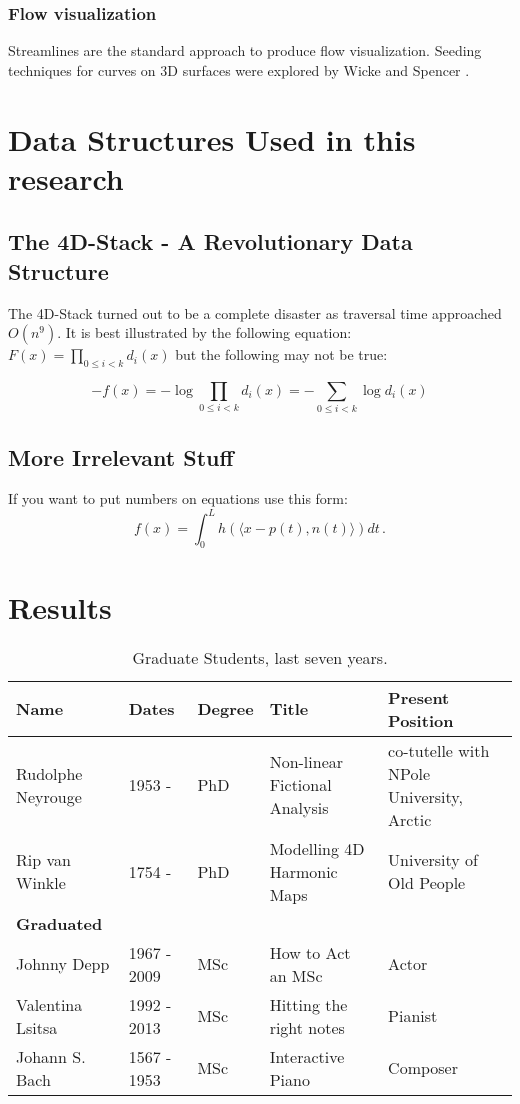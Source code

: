 \documentclass[11pt]{report}
\begin{document}
\subsection{Flow visualization}

Streamlines are the standard approach to produce flow visualization. 
Seeding techniques for curves on 3D surfaces were explored by Wicke \cite{Wicke2009} and Spencer \cite{Spencer2009}.

\chapter{Data Structures Used in this research}
\section{The 4D-Stack - A Revolutionary Data Structure}
The 4D-Stack turned out to be a complete disaster as traversal time approached $O(n^9).$
It is best illustrated by the following equation: $F(x) = \prod_{0\leq i<k}d_i(x)$
but the following may not be true:

\[
-f(x) = - \log \prod_{0\leq i<k}d_i(x) = - \sum_{0\leq i<k} \log d_i(x)
\]


\section{More Irrelevant Stuff}
If you want to put numbers on equations use this form:
\begin{equation}
\label{integralrep}
f(x)=\int_0^L h( \langle x-p(t),n(t) \rangle ) dt\,.
\end{equation}



\chapter{Results}
\begin{table}[tbp]
\begin{tabular}{||l|l|l|p{1.5in}|p{1.2in}||}
\hline
\hline
Name & Dates & Degree & Title & Present Position \\
\hline
Rudolphe Neyrouge & 1953  - & PhD &  Non-linear Fictional Analysis &  co-tutelle with NPole University, Arctic \\
Rip van Winkle & 1754 -  & PhD & Modelling 4D Harmonic Maps & University of Old People \\

\hline
{\bf Graduated} &&&& \\
\hline
Johnny Depp & 1967 - 2009 & MSc & How to Act an MSc & Actor \\
Valentina Lsitsa & 1992 - 2013 & MSc & Hitting the right notes &  Pianist  \\
Johann S. Bach & 1567 - 1953 & MSc & Interactive Piano  & Composer \\\hline
\hline
\end{tabular}
\caption{\label{stud-table} Graduate Students, last seven years.}
\end{table}
\end{document}
